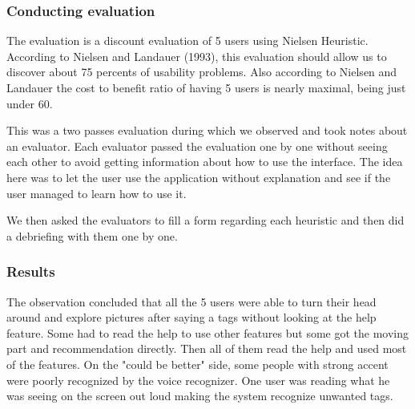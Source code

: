 \documentclass[11pt,a4paper]{article}
\begin{document}
\subsubsection{Conducting evaluation}

The evaluation is a discount evaluation of 5 users using Nielsen Heuristic. According to Nielsen and Landauer (1993), this evaluation should allow us to discover about 75 percents of usability problems. Also according to Nielsen and Landauer the cost to benefit ratio of having 5 users is nearly maximal, being just under 60.

This was a two passes evaluation during which we observed and took notes about an evaluator. Each evaluator passed the evaluation one by one without seeing each other to avoid getting information about how to use the interface. The idea here was to let the user use the application without explanation and see if the user managed to learn how to use it.

We then asked the evaluators to fill a form regarding each heuristic and then did a debriefing with them one by one.

\subsubsection{Results}

The observation concluded that all the 5 users were able to turn their head around and explore pictures after saying a tags without looking at the help feature. Some had to read the help to use other features but some got the moving part and recommendation directly. Then all of them read the help and used most of the features. On the "could be better" side, some people with strong accent were poorly recognized by the voice recognizer. One user was reading what he was seeing on the screen out loud making the system recognize unwanted tags. 
\end{document}
